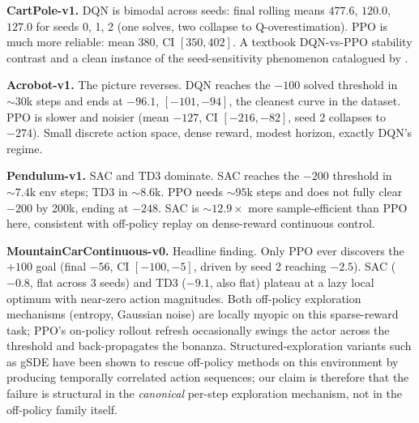 \documentclass[10pt,a4paper]{article}
\begin{document}
\begin{table}[H]
\centering
\resizebox{\textwidth}{!}{%
}
\caption{Scoreboard. Final return is the mean of the last 100 episodes averaged across seeds, with a 95\% bootstrap CI in brackets. ``Steps$\to$thr'' is the first env-step at which the seed-averaged 20-episode rolling mean reaches a task-specific threshold (CartPole 475, Acrobot $-100$, Pendulum $-200$, MountainCarContinuous $90$); ``n/r'' indicates the threshold was not reached within the step budget. Wall is seconds per $10^{5}$ environment steps. Actor params counts only the deployed actor.}
\label{tab:scoreboard}
\end{table}

\textbf{CartPole-v1.} DQN is bimodal across seeds: final rolling means $477.6$, $120.0$, $127.0$ for seeds 0, 1, 2 (one solves, two collapse to Q-overestimation). PPO is much more reliable: mean $380$, CI $[350, 402]$. A textbook DQN-vs-PPO stability contrast and a clean instance of the seed-sensitivity phenomenon catalogued by \cite{henderson2018deep}.

\textbf{Acrobot-v1.} The picture reverses. DQN reaches the $-100$ solved threshold in $\sim 30$k steps and ends at $-96.1$, $[-101, -94]$, the cleanest curve in the dataset. PPO is slower and noisier (mean $-127$, CI $[-216, -82]$, seed 2 collapses to $-274$). Small discrete action space, dense reward, modest horizon, exactly DQN's regime.

\textbf{Pendulum-v1.} SAC and TD3 dominate. SAC reaches the $-200$ threshold in $\sim 7.4$k env steps; TD3 in $\sim 8.6$k. PPO needs $\sim 95$k steps and does not fully clear $-200$ by 200k, ending at $-248$. SAC is $\sim 12.9\times$ more sample-efficient than PPO here, consistent with off-policy replay on dense-reward continuous control.

\textbf{MountainCarContinuous-v0.} Headline finding. Only PPO ever discovers the $+100$ goal (final $-56$, CI $[-100, -5]$, driven by seed 2 reaching $-2.5$). SAC ($-0.8$, flat across 3 seeds) and TD3 ($-9.1$, also flat) plateau at a lazy local optimum with near-zero action magnitudes. Both off-policy exploration mechanisms (entropy, Gaussian noise) are locally myopic on this sparse-reward task; PPO's on-policy rollout refresh occasionally swings the actor across the threshold and back-propagates the bonanza. Structured-exploration variants such as gSDE \cite{raffin2022smooth} have been shown to rescue off-policy methods on this environment by producing temporally correlated action sequences; our claim is therefore that the failure is structural in the \emph{canonical} per-step exploration mechanism, not in the off-policy family itself.
\end{document}
